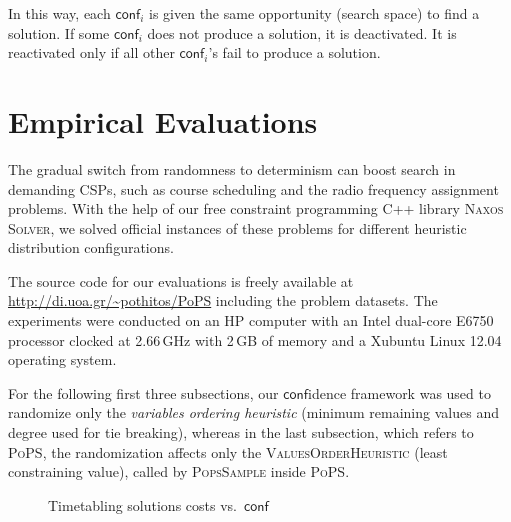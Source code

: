 \documentclass{ws-ijait}
\begin{document}
In this way, each $\mathsf{conf}_i$ is given the same opportunity (search space) to find a solution. If some $\mathsf{conf}_i$ does not produce a solution, it is deactivated. It is reactivated only if all other $\mathsf{conf}_i$'s fail to produce a solution.


\section{Empirical Evaluations}

The gradual switch from randomness to determinism can boost search in demanding CSPs, such as course scheduling and the radio frequency assignment problems. With the help of our free constraint programming C++ library \textsc{Naxos Solver},\cite{naxos-solver} we solved official instances of these problems for different heuristic distribution configurations.

The source code for our evaluations is freely available at \url{http://di.uoa.gr/~pothitos/PoPS} including the problem datasets. The experiments were conducted on an HP computer with an Intel dual-core E6750 processor clocked at 2.66\,GHz with 2\,GB of memory and a Xubuntu Linux 12.04 operating system.

For the following first three subsections, our $\mathsf{conf}$idence framework was used to randomize only the \emph{variables ordering heuristic} (minimum remaining values and degree used for tie breaking), whereas in the last subsection, which refers to \textsc{PoPS}, the randomization affects only the \textsc{ValuesOrderHeuristic} (least constraining value), called by \textsc{PopsSample} inside \textsc{PoPS}.



\begin{figure}
  \centering
  
  \caption{Timetabling solutions costs vs.\ $\mathsf{conf}$\label{costsA}}
\end{figure}
\end{document}
